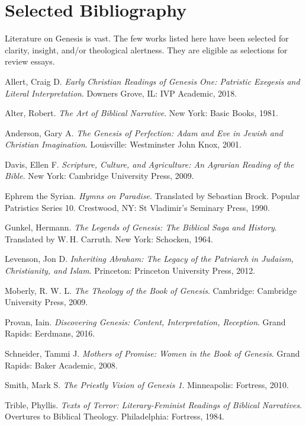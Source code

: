 \documentclass[titlepage]{article}
\newcommand\policy{../policy}
\begin{document}



\section{Selected Bibliography}
\label{bib}

Literature on Genesis is vast. The few works listed here have been selected
for clarity, insight, and/or theological alertness. They are eligible as
selections for review essays.

\begingroup
\renewcommand{\section}[2]{}%
\begin{thebibliography}{99}

 Allert, Craig D. \emph{Early Christian Readings of Genesis One: Patristic Exegesis and Literal Interpretation}. Downers Grove, IL: IVP Academic, 2018.

 Alter, Robert. \emph{The Art of Biblical Narrative}. New York: Basic Books, 1981.

 Anderson, Gary A. \emph{The Genesis of Perfection: Adam and Eve in Jewish and Christian Imagination}. Louisville: Westminster John Knox, 2001.

 Davis, Ellen F. \emph{Scripture, Culture, and Agriculture: An Agrarian Reading of the Bible}. New York: Cambridge University Press, 2009.

 Ephrem the Syrian. \emph{Hymns on Paradise}. Translated by Sebastian Brock. Popular Patristics Series 10. Crestwood, NY: St Vladimir’s Seminary Press, 1990.

 Gunkel, Hermann. \emph{The Legends of Genesis: The Biblical Saga and History}. Translated by W.\,H. Carruth. New York: Schocken, 1964.


 Levenson, Jon D. \emph{Inheriting Abraham: The Legacy of the Patriarch in Judaism, Christianity, and Islam}. Princeton: Princeton University Press, 2012.

 Moberly, R. W. L. \emph{The Theology of the Book of Genesis}. Cambridge: Cambridge University Press, 2009.

 Provan, Iain. \emph{Discovering Genesis: Content, Interpretation, Reception}. Grand Rapids: Eerdmans, 2016.

 Schneider, Tammi J. \emph{Mothers of Promise: Women in the Book of Genesis}. Grand Rapids: Baker Academic, 2008.

 Smith, Mark S. \emph{The Priestly Vision of Genesis 1}. Minneapolis: Fortress, 2010.

 Trible, Phyllis. \emph{Texts of Terror: Literary-Feminist Readings of Biblical Narratives}. Overtures to Biblical Theology. Philadelphia: Fortress, 1984.

\end{thebibliography}
\endgroup
\end{document}
